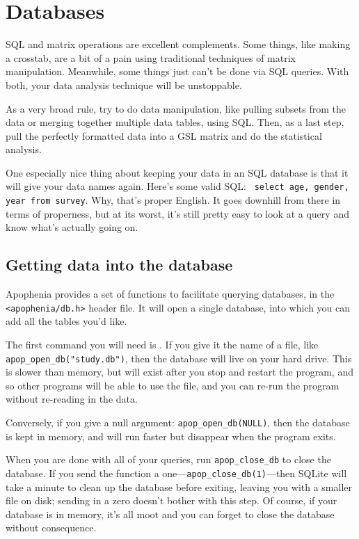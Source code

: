 \chapter{Databases} \label{sql}

SQL and matrix operations are excellent complements. Some things, like
making a crosstab, are a bit of a pain using traditional techniques of
matrix manipulation. Meanwhile, some things just can't be done via SQL
queries. With both, your data analysis technique will be unstoppable.

As a very broad rule, try to do data manipulation, like pulling subsets
from the data or merging together multiple data tables, using SQL. Then,
as a last step, pull the perfectly formatted data into a GSL matrix and
do the statistical analysis. 

One especially nice thing about keeping your data in an SQL database
is that it will give your data names again. Here's some valid SQL: {\tt
select age, gender, year from survey}. Why, that's proper English. It
goes downhill from there in terms of properness, but at its worst, it's
still pretty easy to look at a query and know what's actually going on.

\section{Getting data into the database}
Apophenia provides a set of functions to facilitate querying databases,
in the {\tt <apophenia/db.h>} header file. It will open
a single database, into which you can add all the tables you'd like.

The first command you will need is . If you give
it the name of a file, like {\tt apop\_open\_db("study.db")}, then the
database will live on your hard drive. This is slower than memory, but
will exist after you stop and restart the program, and so other programs
will be able to use the file, and you can re-run the program without
re-reading in the data.

Conversely, if you give a null argument: {\tt apop\_open\_db(NULL)},
then the database is kept in memory, and will run faster but 
disappear when the program exits.

When you are done with all of your queries, run
{\tt apop\_close\_db} to close the database. If you send the function a
one---{\tt apop\_close\_db(1)}---then SQLite will take a minute to clean
up the database before exiting, leaving you with a smaller file on disk;
sending in a zero doesn't bother with this step. Of course, if your
database is in memory, it's all moot and you can forget to close the
database without consequence.

